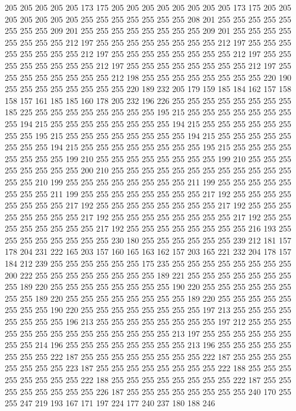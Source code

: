205 205 205 205 205 173 175 205 205 205 205 205 205 205 205 173 175 205 205 205
205 205 205 205 255 255 255 255 255 255 255 208 201 255 255 255 255 255 255 255
255 209 201 255 255 255 255 255 255 255 255 209 201 255 255 255 255 255 255 255
255 212 197 255 255 255 255 255 255 255 255 212 197 255 255 255 255 255 255 255
255 212 197 255 255 255 255 255 255 255 255 212 197 255 255 255 255 255 255 255
255 212 197 255 255 255 255 255 255 255 255 212 197 255 255 255 255 255 255 255
255 212 198 255 255 255 255 255 255 255 255 220 190 255 255 255 255 255 255 255
255 220 189 232 205 179 159 185 184 162 157 158 158 157 161 185 185 160 178 205
232 196 226 255 255 255 255 255 255 255 255 185 225 255 255 255 255 255 255 255
255 195 215 255 255 255 255 255 255 255 255 194 215 255 255 255 255 255 255 255
255 194 215 255 255 255 255 255 255 255 255 195 215 255 255 255 255 255 255 255
255 194 215 255 255 255 255 255 255 255 255 194 215 255 255 255 255 255 255 255
255 195 215 255 255 255 255 255 255 255 255 199 210 255 255 255 255 255 255 255
255 199 210 255 255 255 255 255 255 255 255 200 210 255 255 255 255 255 255 255
255 255 255 255 255 255 255 210 199 255 255 255 255 255 255 255 255 211 199 255
255 255 255 255 255 255 255 211 199 255 255 255 255 255 255 255 255 217 192 255
255 255 255 255 255 255 255 217 192 255 255 255 255 255 255 255 255 217 192 255
255 255 255 255 255 255 255 217 192 255 255 255 255 255 255 255 255 217 192 255
255 255 255 255 255 255 255 217 192 255 255 255 255 255 255 255 255 216 193 255
255 255 255 255 255 255 255 230 180 255 255 255 255 255 255 239 212 181 157 178
204 231 222 165 203 157 160 165 163 162 157 203 165 221 232 204 178 157 184 212
239 255 255 255 255 255 255 175 235 255 255 255 255 255 255 255 255 200 222 255
255 255 255 255 255 255 255 189 221 255 255 255 255 255 255 255 255 189 220 255
255 255 255 255 255 255 255 190 220 255 255 255 255 255 255 255 255 189 220 255
255 255 255 255 255 255 255 189 220 255 255 255 255 255 255 255 255 190 220 255
255 255 255 255 255 255 255 197 213 255 255 255 255 255 255 255 255 196 213 255
255 255 255 255 255 255 255 197 212 255 255 255 255 255 255 255 255 255 255 255
255 255 255 213 197 255 255 255 255 255 255 255 255 214 196 255 255 255 255 255
255 255 255 213 196 255 255 255 255 255 255 255 255 222 187 255 255 255 255 255
255 255 255 222 187 255 255 255 255 255 255 255 255 223 187 255 255 255 255 255
255 255 255 222 188 255 255 255 255 255 255 255 255 222 188 255 255 255 255 255
255 255 255 222 187 255 255 255 255 255 255 255 255 226 187 255 255 255 255 255
255 255 255 240 170 255 255 247 219 193 167 171 197 224 177 240 237 180 188 246

